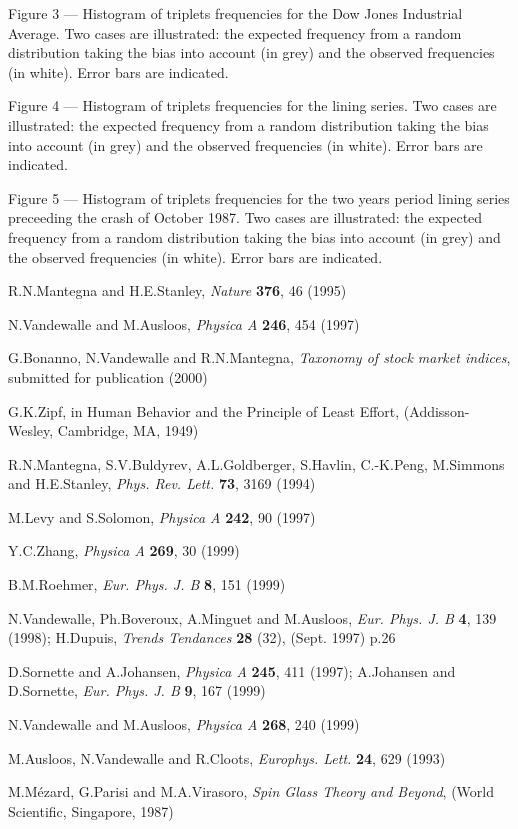 \documentclass[12pt]{article}
\begin{document}
\vskip 1.0cm
Figure 3 --- Histogram of triplets frequencies for the Dow Jones Industrial Average. Two cases are illustrated: the expected frequency from a random distribution taking the bias into account (in grey) and the observed frequencies (in white). Error bars are indicated. 

\vskip 1.0cm
Figure 4 --- Histogram of triplets frequencies for the lining series. Two cases are illustrated: the expected frequency from a random distribution taking the bias into account (in grey) and the observed frequencies (in white). Error bars are indicated.  

\vskip 1.0cm
Figure 5 --- Histogram of triplets frequencies for the two years period lining series preceeding the crash of October 1987. Two cases are illustrated: the expected frequency from a random distribution taking the bias into account (in grey) and the observed frequencies (in white). Error bars are indicated. 



\newpage 
\begin{thebibliography}{99}

 R.N.Mantegna and H.E.Stanley, {\it Nature} {\bf 376}, 46 (1995)

 N.Vandewalle and M.Ausloos, {\it Physica A} {\bf 246}, 454 (1997)

 G.Bonanno, N.Vandewalle and R.N.Mantegna, {\it Taxonomy of stock market indices}, submitted for publication (2000)

 G.K.Zipf, in Human Behavior and the Principle of Least Effort, (Addisson-Wesley, Cambridge, MA, 1949)
	
 R.N.Mantegna, S.V.Buldyrev, A.L.Goldberger, S.Havlin, C.-K.Peng, M.Simmons and H.E.Stanley, {\it Phys. Rev. Lett.} {\bf 73}, 3169 (1994)
	
 M.Levy and S.Solomon, {\it Physica A} {\bf 242}, 90 (1997)

 Y.C.Zhang, {\it Physica A} {\bf 269}, 30 (1999)

 B.M.Roehmer, {\it Eur. Phys. J. B} {\bf 8}, 151 (1999)

 N.Vandewalle, Ph.Boveroux, A.Minguet and M.Ausloos, {\it Eur. Phys. J. B} {\bf 4}, 139 (1998); H.Dupuis, {\it Trends Tendances} {\bf 28} (32), (Sept. 1997) p.26

 D.Sornette and A.Johansen, {\it Physica A} {\bf 245}, 411 (1997); A.Johansen and D.Sornette, {\it Eur. Phys. J. B} {\bf 9}, 167 (1999)

 N.Vandewalle and M.Ausloos, {\it Physica A} {\bf 268}, 240 (1999)

 M.Ausloos, N.Vandewalle and R.Cloots, {\it Europhys. Lett.} {\bf 24}, 629 (1993)

 M.M\'ezard, G.Parisi and M.A.Virasoro,
{\it Spin Glass Theory and Beyond}, (World Scientific, Singapore, 1987)


\end{thebibliography} 
\end{document}
